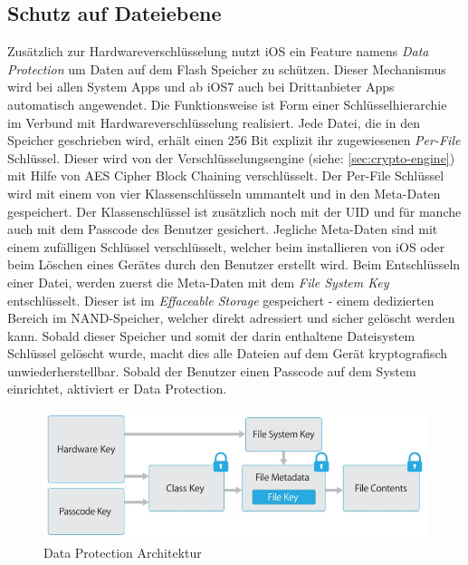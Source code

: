 	\subsection{Schutz auf Dateiebene}
		Zusätzlich zur Hardwareverschlüsselung nutzt iOS ein Feature namens \textsl{Data
		Protection} um Daten auf dem Flash Speicher zu schützen. Dieser Mechanismus
		wird bei allen System Apps und ab iOS7 auch bei Drittanbieter Apps
		automatisch angewendet. Die Funktionsweise ist Form einer Schlüsselhierarchie
		im Verbund mit Hardwareverschlüsselung realisiert. Jede Datei, die in den
		Speicher geschrieben wird, erhält einen 256 Bit explizit ihr zugewiesenen
		\textsl{Per-File} Schlüssel. Dieser wird von der
		Verschlüsselungsengine (siehe: \ref{sec:crypto-engine}) mit Hilfe von
		AES Cipher Block Chaining verschlüsselt. Der Per-File Schlüssel wird mit
		einem von vier Klassenschlüsseln ummantelt und in den Meta-Daten gespeichert.
		Der Klassenschlüssel ist zusätzlich noch mit der UID und für manche auch mit
		dem Passcode des Benutzer gesichert. Jegliche Meta-Daten sind mit einem
		zufälligen Schlüssel verschlüsselt, welcher beim installieren von iOS oder
		beim Löschen eines Gerätes durch den Benutzer erstellt wird. Beim
		Entschlüsseln einer Datei, werden zuerst die Meta-Daten mit dem \textsl{File
		System Key} entschlüsselt. Dieser ist im \textsl{Effaceable Storage}
		gespeichert - einem dedizierten Bereich im NAND-Speicher, welcher direkt
		adressiert und sicher gelöscht werden kann.
		Sobald dieser Speicher und somit der darin enthaltene Dateisystem Schlüssel
		gelöscht wurde, macht dies alle Dateien auf dem Gerät kryptografisch
		unwiederherstellbar. Sobald der Benutzer einen Passcode auf dem System
		einrichtet, aktiviert er Data Protection.
		\begin{figure}[h]
			\centering
			\includegraphics[width=0.9\linewidth]{ios/media/data-protection.jpg}
			\caption{Data Protection Architektur \cite{iOSSecurityApr2015}}
			\label{fig:data-protection}
		\end{figure}
